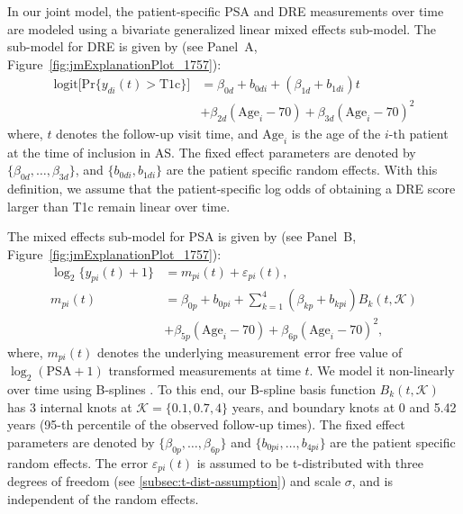 In our joint model, the patient-specific PSA and DRE measurements over time are modeled using a bivariate generalized linear mixed effects sub-model. The sub-model for DRE is given by (see Panel~A, Figure~\ref{fig:jmExplanationPlot_1757}):
\begin{equation}
\label{eq:long_model_dre}
\begin{split}
    \mbox{logit} \big[\mbox{Pr}\{y_{di}(t) > \mbox{T1c}\}\big] &= \beta_{0d} + b_{0di} + (\beta_{1d} + b_{1di}) t\\
    &+ \beta_{2d} (\mbox{Age}_i-70) + \beta_{3d} (\mbox{Age}_i-70)^2
    \end{split}
\end{equation}
where, $t$ denotes the follow-up visit time, and $\mbox{Age}_i$ is the age of the ${i\mbox{-th}}$ patient at the time of inclusion in AS. The fixed effect parameters are denoted by ${\{\beta_{0d}, \ldots, \beta_{3d}\}}$, and ${\{b_{0di}, b_{1di}\}}$ are the patient specific random effects. With this definition, we assume that the patient-specific log odds of obtaining a DRE score larger than T1c remain linear over time. 

The mixed effects sub-model for PSA is given by (see Panel~B, Figure~\ref{fig:jmExplanationPlot_1757}):
\begin{equation}
\label{eq:long_model_psa}
\begin{split}
    \log_2 \big\{y_{pi}(t) + 1\big\} &= m_{pi}(t) + \varepsilon_{pi}(t),\\
    m_{pi}(t) &= \beta_{0p} + b_{0pi} + \sum_{k=1}^4 (\beta_{kp} + b_{kpi})  B_k(t,\mathcal{K})\\ 
    &+ \beta_{5p} (\mbox{Age}_i-70) + \beta_{6p} (\mbox{Age}_i-70)^2,
    \end{split}
\end{equation}
where, $m_{pi}(t)$ denotes the underlying measurement error free value of $\log_2 (\mbox{PSA} + 1)$ transformed \citep{pearson1994mixed,lin2000latent} measurements at time $t$. We model it non-linearly over time using B-splines \citep{de1978practical}. To this end, our B-spline basis function $B_k(t, \mathcal{K})$ has 3 internal knots at $\mathcal{K} = \{0.1, 0.7, 4\}$ years, and boundary knots at 0 and 5.42 years (95-th percentile of the observed follow-up times). The fixed effect parameters are denoted by ${\{\beta_{0p},\ldots,\beta_{6p}\}}$ and ${\{b_{0pi}, \ldots, b_{4pi}\}}$ are the patient specific random effects. The error $\varepsilon_{pi}(t)$ is assumed to be t-distributed with three degrees of freedom (see \ref{subsec:t-dist-assumption}) and scale $\sigma$, and is independent of the random effects. 

